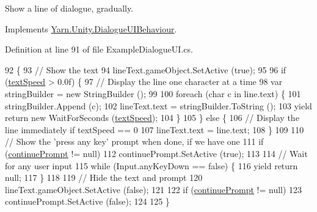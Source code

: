 Show a line of dialogue, gradually. 



Implements \hyperlink{a00089_a754c6dd0bc67895d11f878fe4477d698}{Yarn.\-Unity.\-Dialogue\-U\-I\-Behaviour}.



Definition at line 91 of file Example\-Dialogue\-U\-I.\-cs.


\begin{DoxyCode}
92         \{
93             \textcolor{comment}{// Show the text}
94             lineText.gameObject.SetActive (\textcolor{keyword}{true});
95 
96             \textcolor{keywordflow}{if} (\hyperlink{a00095_a6053aa65534195d626031413ef3a0828}{textSpeed} > 0.0f) \{
97                 \textcolor{comment}{// Display the line one character at a time}
98                 var stringBuilder = \textcolor{keyword}{new} StringBuilder ();
99 
100                 \textcolor{keywordflow}{foreach} (\textcolor{keywordtype}{char} c \textcolor{keywordflow}{in} line.text) \{
101                     stringBuilder.Append (c);
102                     lineText.text = stringBuilder.ToString ();
103                     yield \textcolor{keywordflow}{return} \textcolor{keyword}{new} WaitForSeconds (\hyperlink{a00095_a6053aa65534195d626031413ef3a0828}{textSpeed});
104                 \}
105             \} \textcolor{keywordflow}{else} \{
106                 \textcolor{comment}{// Display the line immediately if textSpeed == 0}
107                 lineText.text = line.text;
108             \}
109 
110             \textcolor{comment}{// Show the 'press any key' prompt when done, if we have one}
111             \textcolor{keywordflow}{if} (\hyperlink{a00095_a74367b77a6a5218fa47dbe1d6266e4c6}{continuePrompt} != null)
112                 continuePrompt.SetActive (\textcolor{keyword}{true});
113 
114             \textcolor{comment}{// Wait for any user input}
115             \textcolor{keywordflow}{while} (Input.anyKeyDown == \textcolor{keyword}{false}) \{
116                 yield \textcolor{keywordflow}{return} null;
117             \}
118 
119             \textcolor{comment}{// Hide the text and prompt}
120             lineText.gameObject.SetActive (\textcolor{keyword}{false});
121 
122             \textcolor{keywordflow}{if} (\hyperlink{a00095_a74367b77a6a5218fa47dbe1d6266e4c6}{continuePrompt} != null)
123                 continuePrompt.SetActive (\textcolor{keyword}{false});
124 
125         \}
\end{DoxyCode}
